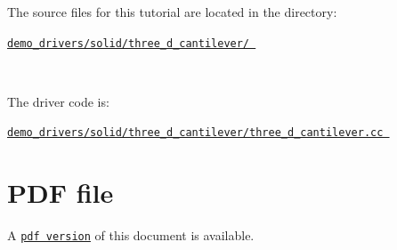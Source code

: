 \begin{DoxyItemize}
\item The source files for this tutorial are located in the directory\+:~\newline
~\newline
\begin{center} \href{../../../../demo_drivers/solid/three_d_cantilever/}{\tt demo\+\_\+drivers/solid/three\+\_\+d\+\_\+cantilever/ } \end{center} ~\newline

\item The driver code is\+: ~\newline
~\newline
\begin{center} \href{../../../../demo_drivers/solid/three_d_cantilever/three_d_cantilever.cc}{\tt demo\+\_\+drivers/solid/three\+\_\+d\+\_\+cantilever/three\+\_\+d\+\_\+cantilever.\+cc } \end{center} 
\end{DoxyItemize}



 

 \hypertarget{index_pdf}{}\section{P\+D\+F file}\label{index_pdf}
A \href{../latex/refman.pdf}{\tt pdf version} of this document is available. 

